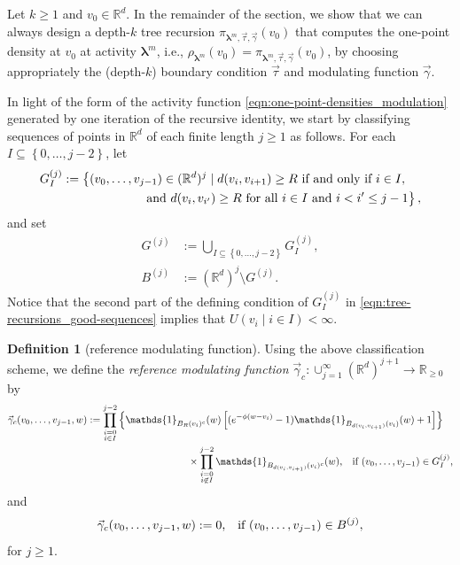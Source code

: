\documentclass[11pt]{article}
\newcommand{\R}{\mathbb R}
\newcommand{\bl}{\bm{\lambda}}
\newcommand{\hcconst}{R}
\newcommand{\set}[1]{\left\{#1\right\}}
\newcommand{\indicator}[1]{\mathds{1}_{#1}}
\numberwithin{equation}{section}
\theoremstyle{plain}
\theoremstyle{definition}
\newtheorem{definition}[theorem]{Definition}
\theoremstyle{remark}
\begin{document}
Let $k\ge 1$ and $v_{0}\in\R^{d}$.
In the remainder of the section, we show that we can always design a depth-$k$ tree recursion $\pi_{\bl^{m},\vec{\tau},\vec{\gamma}}(v_{0})$ that computes the one-point density at $v_{0}$ at activity $\bl^{m}$, i.e., $\rho_{\bl^{m}}(v_{0})=\pi_{\bl^{m},\vec{\tau},\vec{\gamma}}(v_{0})$, by choosing appropriately the (depth-$k$) boundary condition $\vec{\tau}$ and modulating function $\vec{\gamma}$.

In light of the form of the activity function \eqref{eqn:one-point-densities_modulation} generated by one iteration of the recursive identity, we start by classifying sequences of points in $\R^{d}$ of each finite length $j\ge 1$ as follows.
For each $I\subseteq\set{0,\dots,j-2}$, let
\begin{equation}
\label{eqn:tree-recursions_good-sequences}
\begin{multlined}
G_{I}^{(j)}:=\left\{(v_{0},\dots,v_{j-1})\in(\R^{d})^{j}\mid d(v_{i},v_{i+1})\ge\hcconst\text{ if and only if }i\in I,\right.
\\
\left.\text{and }d(v_{i},v_{i'})\ge\hcconst\text{ for all }i\in I\text{ and }i<i'\le j-1\vphantom{(\R^{d})^{j}}\right\},
\end{multlined}
\end{equation}
and set
\begin{align}
G^{(j)}{}&:=\bigcup_{I\subseteq\set{0,\dots,j-2}}G^{(j)}_{I},\\
\label{eqn:tree-recursions_bad-sequences}
B^{(j)}{}&:=(\R^{d})^{j}\setminus G^{(j)}.
\end{align}
Notice that the second part of the defining condition of $G^{(j)}_{I}$ in \eqref{eqn:tree-recursions_good-sequences} implies that $U(v_{i}\mid i\in I)<\infty$.

\begin{definition}[reference modulating function]
\label{def:tree-recursions_canonical-modulating-function}
Using the above classification scheme, we define the \emph{reference modulating function} $\vec{\gamma}_{c}:\cup_{j=1}^{\infty}(\R^{d})^{j+1}\rightarrow\R_{\ge 0}$ by
\begin{equation}
\label{eqn:tree-recursions_canonical-modulating-function-good-sequence}
\begin{multlined}
\vec{\gamma}_{c}(v_{0},\dots,v_{j-1},w):=
\prod_{\substack{i=0\\ i\in I}}^{j-2}\left\{\indicator{B_{\hcconst}(v_{i})^{c}}(w)\left[(e^{-\phi(w-v_{i})}-1)\indicator{B_{d(v_{i},v_{i+1})}(v_{i})}(w)+1\right]\right\}
\\
\times\prod_{\substack{i=0\\ i\not\in I}}^{j-2}\indicator{B_{d(v_{i},v_{i+1})}(v_{i})^{c}}(w)
\text{,\quad if }(v_{0},\dots,v_{j-1})\in G_{I}^{(j)},
\end{multlined}
\end{equation}
and 
\begin{equation}
\label{eqn:tree-recursions_canonical-modulating-function-bad-sequence}
\vec{\gamma}_{c}(v_{0},\dots,v_{j-1},w):=0\text{,\quad if } (v_{0},\dots,v_{j-1})\in B^{(j)},
\end{equation}
for $j\ge 1$.
\end{definition}
\end{document}

